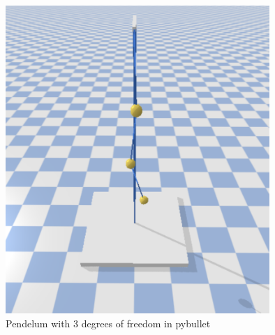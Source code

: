  \begin{figure}[h!]
 	\label{pend}
 	\centering
 	\includegraphics[width=10cm]{chapters/chapter3/pendelum-1.pdf}
 	\caption{Pendelum with 3 degrees of freedom in pybullet}
 	\label{pyb}
 \end{figure}




 
 


 

